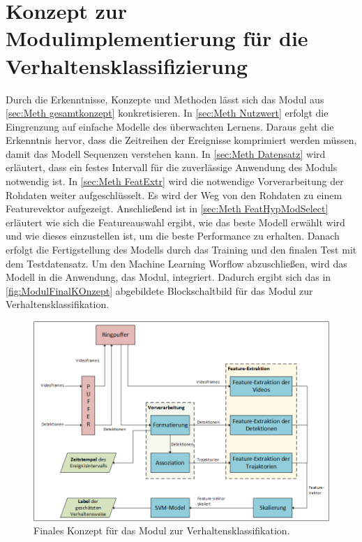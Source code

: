 \section{Konzept zur Modulimplementierung für die Verhaltensklassifizierung} \label{sec:Meth FinalKonzept}
Durch die Erkenntnisse, Konzepte und Methoden lässt sich das Modul aus \autoref{sec:Meth gesamtkonzept} konkretisieren. In \autoref{sec:Meth Nutzwert} erfolgt die Eingrenzung auf einfache Modelle des überwachten Lernens. Daraus geht die Erkenntnis hervor, dass  die Zeitreihen der Ereignisse komprimiert werden müssen, damit das Modell Sequenzen verstehen kann. In \autoref{sec:Meth Datensatz} wird erläutert, dass ein festes Intervall für die zuverlässige Anwendung des Moduls notwendig ist. In \autoref{sec:Meth FeatExtr} wird die notwendige Vorverarbeitung der Rohdaten weiter aufgeschlüsselt. Es wird der Weg von den Rohdaten zu einem Featurevektor aufgezeigt. Anschließend ist in \autoref{sec:Meth FeatHypModSelect} erläutert wie sich die Featureauswahl ergibt, wie das beste Modell erwählt wird und wie dieses einzustellen ist, um die beste Performance zu erhalten. Danach erfolgt die Fertigstellung des Modells durch das Training und den finalen Test mit dem Testdatensatz. Um den Machine Learning Worflow abzuschließen, wird das Modell in die Anwendung, das Modul, integriert. Dadurch ergibt sich das in \autoref{fig:ModulFinalKOnzept} abgebildete Blockschaltbild für das Modul zur Verhaltensklassifikation.


\begin{figure}[htb]
    \centering
    \includegraphics[width=\textwidth]{img/Grafiken/Gesamtkonzept Final.png}
    \caption[Finales Konzept für das Modul zur Verhaltensklassifikation.]{Finales Konzept für das Modul zur Verhaltensklassifikation.}
    \label{fig:ModulFinalKOnzept}
\end{figure}


